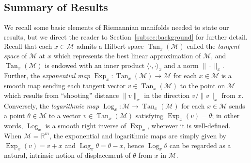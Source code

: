 \documentclass[preprint]{imsart}
\theoremstyle{plain}
\theoremstyle{definition}
\newcommand{\Rbb}{\mathbb{R}}
\newcommand{\Mcal}{\mathcal{M}}
\DeclareMathOperator{\Tan}{Tan}
\DeclareMathOperator{\Log}{Log}
\DeclareMathOperator{\Exp}{Exp}
\begin{document}
    \subsection{Summary of Results}

    We recall some basic elements of Riemannian manifolds needed to state our results, but we direct the reader to Section~\ref{subsec:background} for further detail.
    Recall that each $x\in\Mcal$ admits a Hilbert space $\Tan_x(\Mcal)$ called the \textit{tangent space} of $\Mcal$ at $x$ which represents the best linear approximation of $\Mcal$, and $\Tan_x(\Mcal)$ is endowed with an inner product $\langle\cdot,\cdot\rangle_x$ and a norm $\|\cdot\|_x$.
    Further, the \emph{exponential map} $\Exp_x:\Tan_x(\Mcal)\to\Mcal$ for each $x\in\Mcal$ is a smooth map sending each tangent vector $v\in\Tan_x(\Mcal)$ to the point on $\Mcal$ which results from ``shooting'' distance $\|v\|_x$ in the direction $v/\|v\|_x$ from $x$.
    Conversely, the \textit{logarithmic map} $\Log_x:\Mcal\to\Tan_x(\Mcal)$ for each $x\in\Mcal$ sends a point $\theta\in\Mcal$ to a vector $v\in\Tan_x(\Mcal)$ satisfying $\Exp_x(v) = \theta$; in other words, $\Log_x$ is a smooth right inverse of $\Exp_x$, wherever it is well-defined.
    When $\Mcal=\Rbb^m$, the exponential and logarithmic maps are simply given by $\Exp_x(v) = v+x$ and $\Log_x \theta = \theta - x$, hence $\Log_x\theta$ can be regarded as a natural, intrinsic notion of displacement of $\theta$ from $x$ in $\Mcal$.
\end{document}
